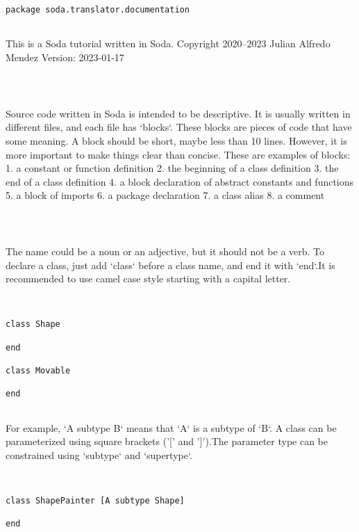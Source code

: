 \documentclass[12pt,a4paper]{article}
\begin{document}
\begin{lstlisting}
package soda.translator.documentation


\end{lstlisting}

This is a Soda tutorial written in Soda.
Copyright 2020--2023 Julian Alfredo Mendez
 Version: 2023-01-17


\begin{lstlisting}



\end{lstlisting}

Source code written in Soda is intended to be descriptive.
It is usually written in different files, and each file has `blocks`.
These blocks are pieces of code that have some meaning.
A block should be short, maybe less than 10 lines.
However, it is more important to make things clear than concise.
These are examples of blocks:
1. a constant or function definition
2. the beginning of a class definition
3. the end of a class definition
4. a block declaration of abstract constants and functions
5. a block of imports
6. a package declaration
7. a class alias
 8. a comment


\begin{lstlisting}



\end{lstlisting}

The name could be a noun or an adjective, but it should not be a verb. To declare a class, just add `class` before a class name, and end it with `end`.It is recommended to use camel case style starting with a capital letter.


\begin{lstlisting}


class Shape

end

class Movable

end


\end{lstlisting}

For example, `A subtype B` means that `A` is a subtype of `B`. A class can be parameterized using square brackets ('[' and ']').The parameter type can be constrained using `subtype` and `supertype`.


\begin{lstlisting}


class ShapePainter [A subtype Shape]

end


\end{lstlisting}
\end{document}
